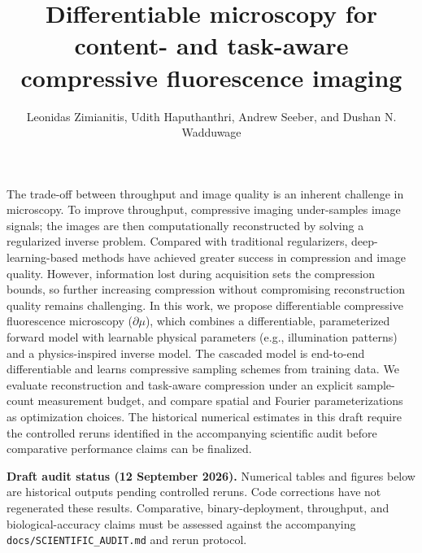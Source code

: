 \documentclass{optica-article}
\begin{document}
\title{Differentiable microscopy for content- and task-aware compressive fluorescence imaging}

\author{Leonidas Zimianitis,
Udith Haputhanthri,
Andrew Seeber,
and Dushan N. Wadduwage}

\address{Department of Computer Science, Old Dominion University, Norfolk, VA 23529, USA\\
Department of Electrical and Computer Engineering, Princeton University, Princeton, NJ 08544, USA\\
Transition Bio, Inc., Cambridge, MA, USA\\
School of Data Science, Old Dominion University, Norfolk, VA 23529, USA\\
Department of Physics, Old Dominion University, Norfolk, VA 23529, USA}


\begin{abstract*}
The trade-off between throughput and image quality is an inherent challenge in microscopy. To improve throughput, compressive imaging under-samples image signals; the images are then computationally reconstructed by solving a regularized inverse problem. Compared with traditional regularizers, deep-learning-based methods have achieved greater success in compression and image quality. However, information lost during acquisition sets the compression bounds, so further increasing compression without compromising reconstruction quality remains challenging. In this work, we propose differentiable compressive fluorescence microscopy ($\partial \mu$), which combines a differentiable, parameterized forward model with learnable physical parameters (e.g., illumination patterns) and a physics-inspired inverse model. The cascaded model is end-to-end differentiable and learns compressive sampling schemes from training data. We evaluate reconstruction and task-aware compression under an explicit sample-count measurement budget, and compare spatial and Fourier parameterizations as optimization choices. The historical numerical estimates in this draft require the controlled reruns identified in the accompanying scientific audit before comparative performance claims can be finalized.

\end{abstract*}

\noindent\textbf{Draft audit status (12 September 2026).} Numerical tables and figures below are historical outputs pending controlled reruns. Code corrections have not regenerated these results. Comparative, binary-deployment, throughput, and biological-accuracy claims must be assessed against the accompanying \texttt{docs/SCIENTIFIC\_AUDIT.md} and rerun protocol.\par
\end{document}
